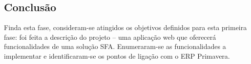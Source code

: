 \begin{titlepage}
\section{Conclusão}
\justify\normalsize
Finda esta fase, consideram-se atingidos os objetivos definidos para esta primeira fase: foi feita a descrição do projeto – uma aplicação web que oferecerá funcionalidades de uma solução SFA. Enumeraram-se as funcionalidades a implementar e identificaram-se os pontos de ligação com o ERP Primavera.




\end{titlepage}
